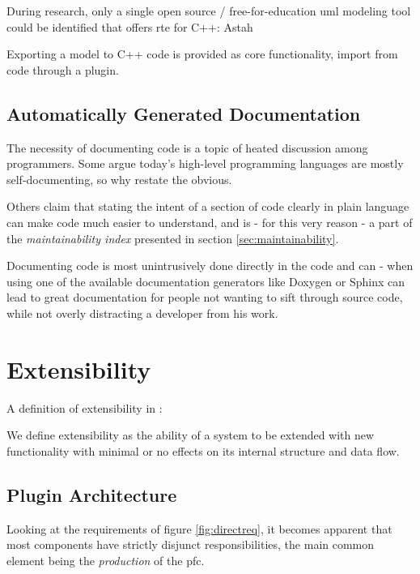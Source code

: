 During research, only a single open source / free-for-education \gls{uml} modeling tool could be identified that offers \gls{rte} for C++: Astah

Exporting a model to C++ code is provided as core functionality, import from code through a plugin.

\subsection{Automatically Generated Documentation}\label{sec:resdoxygen}
The necessity of documenting code is a topic of heated discussion among programmers. Some argue today's high-level programming languages are mostly self-documenting, so why restate the obvious.

Others claim that stating the intent of a section of code clearly in plain language can make code much easier to understand, and is - for this very reason - a part of the \textit{maintainability index} presented in section \ref{sec:maintainability}.

Documenting code is most unintrusively done directly in the code and can - when using one of the available documentation generators like Doxygen or Sphinx can lead to great documentation for people not wanting to sift through source code, while not overly distracting a developer from his work.

\section{Extensibility}

A definition of extensibility in \citet[p.3]{Johansson}:
\begin{definition}[Extensibility]
We define extensibility as the ability of a system to be extended with new functionality with minimal or no effects on its internal structure and data flow.
\end{definition}

\subsection{Plugin Architecture}\label{sec:resplug}
Looking at the requirements of figure \ref{fig:directreq}, it becomes apparent that most components have strictly disjunct responsibilities, the main common element being the \textit{production} of the \gls{pfc}.

